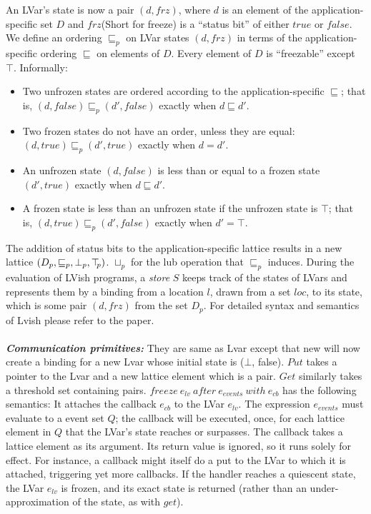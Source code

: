 \documentclass[twocolumn]{article}
\newcommand{\userleq}{\ensuremath{\sqsubseteq}}
\newcommand{\lubp}[2]{\ensuremath{#1 \sqcup_p #2}}
\newcommand{\leqp}{\ensuremath{\sqsubseteq_p}}
\newcommand{\botp}{\ensuremath{\bot_{p}}}
\newcommand{\topp}{\ensuremath{\top\hspace{-0.85mm}_{p}}}
\newcommand{\state}[2]{\ensuremath{(#1, #2)}}
\newcommand{\status}{\ensuremath{\mathit{frz}}}
\begin{document}
An LVar’s state is now a pair $(d,frz )$, where $d$ is an element of the application-specific set $D$ and $frz$(Short for freeze) is a “status bit” of either $true$ or $false$. We define an ordering $\leqp$ on LVar states $\state{d}{\status}$ in terms of the application-specific ordering $\userleq$ on elements of $D$. Every element of $D$ is ``freezable'' except $\top$. Informally: 
\begin{itemize}
\item Two unfrozen states are ordered according to the application-specific $\userleq$; that is, $(d,false) \leqp (d',false)$
exactly when $d \userleq d'$.
\item Two frozen states do not have an order, unless they are equal: $(d,true) \leqp (d',true)$ exactly when $d = d'$.
\item An unfrozen state $(d,false)$ is less than or equal to a frozen state $(d',true)$ exactly when $d \userleq d'$.
\item A frozen state is less than an unfrozen state if the unfrozen state is $\top$; that is, $(d,true) \leqp (d',false)$ exactly when $d' = \top$.
\end{itemize}
The addition of status bits to the application-specific lattice results in a new lattice $(D_p, \leqp, \botp, \topp)$. $\lubp{}{}$ for the lub operation that $\leqp$ induces. During the evaluation of LVish programs, a \emph{store} $S$ keeps track of the states of LVars and represents them by a binding from a location $l$, drawn from a set $loc$, to its state, which is some pair $(d, frz)$ from the set $D_p$. For detailed syntax and semantics of Lvish please refer to the paper\cite{lkuper2}.\\ \\
\textbf{\textit{Communication primitives:}} They are same as Lvar except that new will now create a binding for a new Lvar whose initial state is ($\bot$, false). $Put$ takes a pointer to the Lvar and a new lattice element which is a pair. $Get$ similarly takes a threshold set containing pairs. $freeze\ e_{lv}\ after\ e_{events}\ with\ e_{cb}$ has the following semantics: It attaches the callback $e_{cb}$ to the LVar $e_{lv}$. The expression $e_{events}$ must evaluate to a event set $Q$; the callback will be executed, once, for each lattice element in $Q$ that the LVar’s state reaches or surpasses. The callback takes a lattice element as its argument. Its return value is ignored, so it runs solely for effect. For instance, a callback might itself do a put to the LVar to which it is attached, triggering yet more callbacks. If the handler reaches a quiescent state, the LVar $e_{lv}$ is frozen, and its exact state is returned (rather than an under-approximation of the state, as with $get$).
\end{document}
